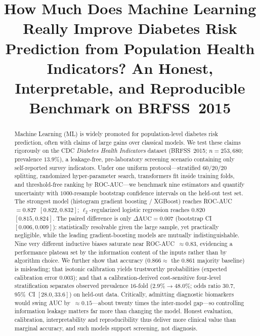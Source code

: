 \documentclass[conference]{IEEEtran}
\begin{document}
\title{How Much Does Machine Learning Really Improve Diabetes Risk Prediction
from Population Health Indicators? An Honest, Interpretable, and Reproducible
Benchmark on BRFSS~2015}

\author{
}

\maketitle

\begin{abstract}
Machine Learning (ML) is widely promoted for population-level diabetes risk
prediction, often with claims of large gains over classical models. We test these
claims rigorously on the CDC \emph{Diabetes Health Indicators} dataset (BRFSS~2015;
$n=253{,}680$; prevalence $13.9\%$), a leakage-free, pre-laboratory screening scenario
containing only self-reported survey indicators. Under one uniform protocol---stratified
$60/20/20$ splitting, randomized hyper-parameter search, transformers fit inside training
folds, and threshold-free ranking by ROC-AUC---we benchmark nine estimators and quantify
uncertainty with $1000$-resample bootstrap confidence intervals on the held-out test set.
The strongest model (histogram gradient boosting / XGBoost) reaches
ROC-AUC~$=0.827$~$[0.822,0.832]$; $\ell_2$-regularized logistic regression reaches
$0.820$~$[0.815,0.824]$. The paired difference is only $\Delta\text{AUC}=0.007$ (bootstrap
CI $[0.006,0.009]$): statistically resolvable given the large sample, yet practically
negligible, while the leading gradient-boosting models are mutually indistinguishable.
Nine very different inductive biases saturate near ROC-AUC~$\approx0.83$, evidencing a
performance plateau set by the information content of the inputs rather than by algorithm
choice. We further show that accuracy ($0.866\approx$ the $0.861$ majority baseline) is
misleading; that isotonic calibration yields trustworthy probabilities (expected
calibration error $0.003$); and that a calibration-derived cost-sensitive four-level
stratification separates observed prevalence $16$-fold ($2.9\%\!\to\!48.0\%$; odds ratio
$30.7$, $95\%$~CI $[28.0,33.6]$) on held-out data. Critically, admitting diagnostic
biomarkers would swing AUC by~$\approx0.15$---about twenty times the inter-model
gap---so controlling information leakage matters far more than changing the model. Honest
evaluation, calibration, interpretability and reproducibility thus deliver more clinical
value than marginal accuracy, and such models support screening, not diagnosis.
\end{abstract}
\end{document}
